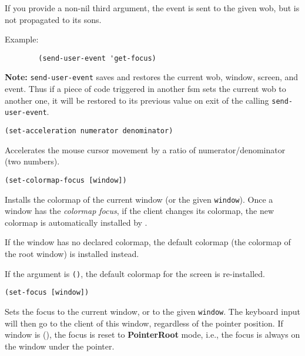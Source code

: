 If you provide a non-nil third argument, the event is sent to the given wob,
but is not propagated to its sons.

Example: 
{\exemplefont\upspace\begin{verbatim}
        (send-user-event 'get-focus)
\end{verbatim}}

{\bf Note:} \verb"send-user-event" saves and restores the current wob,
window, screen, and event. Thus if a piece of code triggered in another fsm sets the
current wob to another one, it will be restored to its previous value on
exit of the calling \verb"send-user-event".

        
{\usagefont\begin{verbatim}
(set-acceleration numerator denominator)
\end{verbatim}}\usageupspace

Accelerates the mouse cursor movement by a ratio of numerator/denominator
(two numbers).


{\usagefont\begin{verbatim}
(set-colormap-focus [window])
\end{verbatim}}\usageupspace

Installs the colormap of the current window (or the given \verb"window").
Once a window has the {\em colormap focus}, if the
client changes its colormap, the new colormap is automatically installed by
{\GWM}.

If the window has no declared colormap, the default colormap (the colormap
of the root window) is installed instead.

If the argument is \verb"()", the default colormap for the screen is
re-installed.

        
{\usagefont\begin{verbatim}
(set-focus [window])
\end{verbatim}}\usageupspace

Sets the focus to the current window, or to the given \verb"window". The
keyboard input will then go to the client of this window, regardless of the
pointer position. If window is (), the focus is reset to {\bf PointerRoot}
mode, i.e., the focus is always on the window under the pointer.

